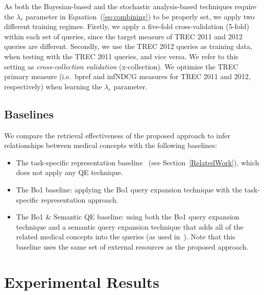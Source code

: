 \documentclass[1p]{elsarticle}
\begin{document}
As both the Bayesian-based and the stochastic analysis-based techniques require the $\lambda_r$ parameter in Equation~(\ref{eq:combining}) to be properly set, we apply two different training regimes. 
Firstly, we apply a five-fold cross-validation (5-fold) within each set of queries, since the target measure of TREC 2011 and 2012 queries are different. Secondly, we use the TREC 2012 queries as training data, when testing with the TREC 2011 queries, and vice versa. We refer to this setting as \emph{cross-collection validation} (x-collection). 
We optimise the TREC primary measure (i.e.\ bpref and infNDCG measures for TREC 2011 and 2012, respectively) when learning the $\lambda_r$ parameter.

\subsection{Baselines}
We compare the retrieval effectiveness of the proposed approach to infer relationships between medical concepts with the following baselines:
\begin{itemize}
\item The task-specific representation baseline~\cite{limsopatham2013ecir-b} (see Section~\ref{RelatedWork}), which does not apply any QE technique.
\item The Bo1 baseline: applying the Bo1 query expansion technique with the task-specific representation approach.
\item The Bo1 \& Semantic QE baseline: using both the Bo1 query expansion technique and a semantic query expansion technique that adds all of the related medical concepts into the queries (as used in~\cite{king2011trec}). Note that this baseline uses the same set of external resources as the proposed approach.
\end{itemize}


\section{Experimental Results}\label{c7sResults}
\end{document}
